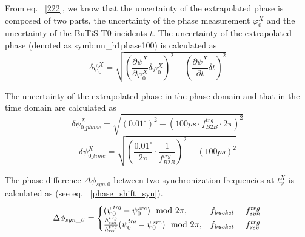 From eq. ~\ref{222}, we know that the uncertainty of the extrapolated phase is composed of two parts, the uncertainty of the phase measurement $\varphi^X_0$ and the uncertainty of the BuTiS T0 incidents $t$. The uncertainty of the extrapolated phase (denoted as \gls{symb:un_h1phase100}) is calculated as 
\begin{equation} 
\delta \psi^{X}_{0}=\sqrt{(\frac {\partial \psi^{X}}{\partial \varphi^X_0}\delta  \varphi^X_0)^2+(\frac {\partial \psi^{X}}{\partial t}\delta t)^2 }
\end{equation}

The uncertainty of the extrapolated phase in the phase domain and that in the time domain are calculated as 
\begin{equation} 
\delta \psi^{X}_\mathit{0\_phase}=\sqrt{(0.01^\circ)^2+(100ps \cdot f_\mathit{B2B}^\mathit{trg} \cdot {2\pi})^2}
\label{jitter_measure_p}
\end{equation}
\begin{equation} 
\delta \psi^{X}_\mathit{0\_time}=\sqrt{(\frac{0.01^\circ}{2\pi}\cdot \frac{1}{f_\mathit{B2B}^\mathit{trg}})^2+(100ps)^2} 
\label{jitter_measure_p}
\end{equation}

The phase difference $\Delta \phi_\mathit{syn\_0}$ between two synchronization frequencies at $t_\psi^X$ is calculated as (see eq. ~\ref{phase_shift_syn}).
\begin{eqnarray}\label{phase_syn}
\Delta \phi_\mathit{syn\_0}=
\begin{cases}
(\psi^\mathit{trg}_0-\psi^\mathit{src}_0) \mod 2\pi, &f_{\mathit{bucket}}=f_{\mathit{syn}}^{trg}\cr
\frac{h_{\mathit{syn}}^{trg}}{h_{\mathit{rev}}^{trg}}(\psi^\mathit{trg}_0-\psi^\mathit{src}_0) \mod 2\pi, &f_{\mathit{bucket}}=f_{\mathit{rev}}^{trg}\cr
\end{cases}
\end{eqnarray}


